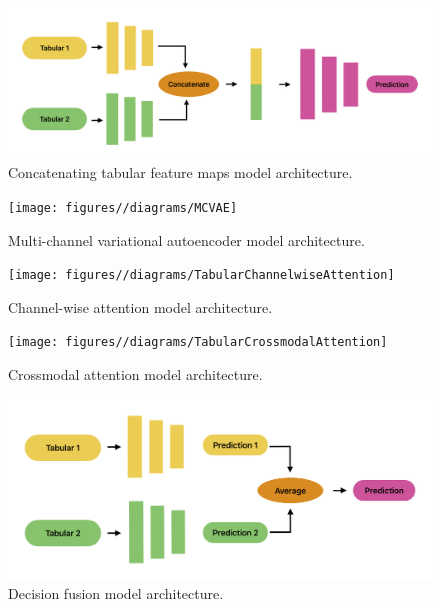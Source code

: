 \begin{figure}[h]
    \centering
    \includegraphics[width=1\linewidth]{figures//diagrams/ConcatTabularFeatureMaps}
    \caption{Concatenating tabular feature maps model architecture.}
    \label{fig:ConcatTabularFeatureMaps}
\end{figure}

\begin{figure}[h]
    \centering
    \texttt{[image: figures//diagrams/MCVAE]}
    \caption{Multi-channel variational autoencoder model architecture.}
    \label{fig:MCVAE}
\end{figure}

\begin{figure}[h]
    \centering
    \texttt{[image: figures//diagrams/TabularChannelwiseAttention]}
    \caption{Channel-wise attention model architecture.}
    \label{fig:TabularChannelwiseAttention}
\end{figure}

\begin{figure}[h]
    \centering
    \texttt{[image: figures//diagrams/TabularCrossmodalAttention]}
    \caption{Crossmodal attention model architecture.}
    \label{fig:TabularCrossmodalAttention}
\end{figure}

\begin{figure}[h]
    \centering
    \includegraphics[width=1\linewidth]{figures//diagrams/TabularDecision}
    \caption{Decision fusion model architecture.}
    \label{fig:TabularDecision}
\end{figure}

